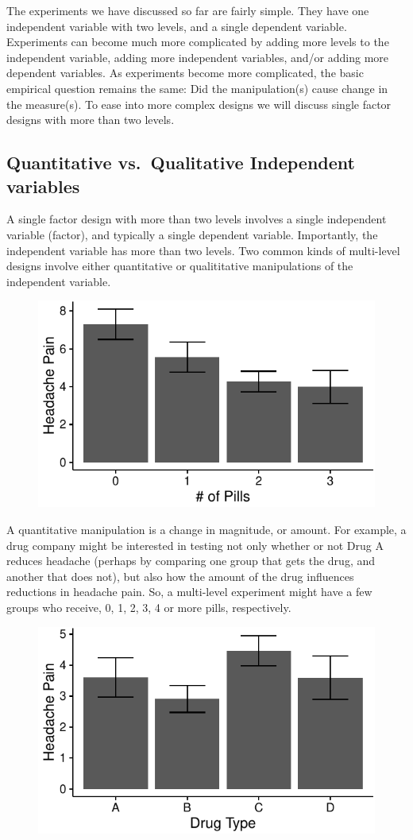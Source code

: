 The experiments we have discussed so far are fairly simple. They have
one independent variable with two levels, and a single dependent
variable. Experiments can become much more complicated by adding more
levels to the independent variable, adding more independent variables,
and/or adding more dependent variables. As experiments become more
complicated, the basic empirical question remains the same: Did the
manipulation(s) cause change in the measure(s). To ease into more
complex designs we will discuss single factor designs with more than two
levels.

\subsection{Quantitative vs.~Qualitative Independent
variables}\label{quantitative-vs.qualitative-independent-variables}

A single factor design with more than two levels involves a single
independent variable (factor), and typically a single dependent
variable. Importantly, the independent variable has more than two
levels. Two common kinds of multi-level designs involve either
quantitative or qualititative manipulations of the independent variable.

\begin{figure}
\includegraphics[width=.6\linewidth]{OneWay_files/figure-latex/unnamed-chunk-1-1} 
\end{figure}

A quantitative manipulation is a change in magnitude, or amount. For
example, a drug company might be interested in testing not only whether
or not Drug A reduces headache (perhaps by comparing one group that gets
the drug, and another that does not), but also how the amount of the
drug influences reductions in headache pain. So, a multi-level
experiment might have a few groups who receive, 0, 1, 2, 3, 4 or more
pills, respectively.

\begin{figure}
\includegraphics[width=.6\linewidth]{OneWay_files/figure-latex/unnamed-chunk-2-1} \end{figure}

